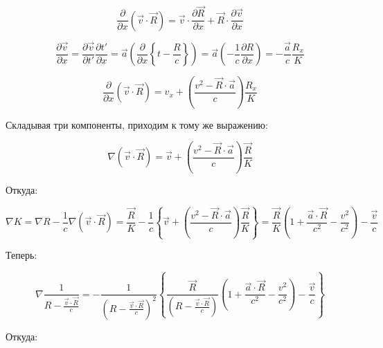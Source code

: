 \documentclass[12pt, a4paper]{article}
\begin{document}
\begin{equation}
\frac{\partial}{\partial x} (\vec{v} \cdot \vec{R}) = \vec{v} \cdot \frac{\partial \vec{R}}{\partial x} + \vec{R} \cdot \frac{\partial \vec{v}}{\partial x}
\label{eq:d_vR_dx}
\end{equation}

\begin{equation}
\frac{\partial \vec{v}}{\partial x} = \frac{\partial \vec{v}}{\partial t'} \frac{\partial t'}{\partial x} = \vec{a} \left( \frac{\partial}{\partial x} \left\{ t - \frac{R}{c} \right\} \right) = \vec{a} \left( -\frac{1}{c} \frac{\partial R}{\partial x} \right) = -\frac{\vec{a}}{c} \frac{R_x}{K}
\label{eq:dv_dx_short}
\end{equation}

\begin{equation}
\frac{\partial}{\partial x} (\vec{v} \cdot \vec{R}) = v_x + \left( \frac{v^2 - \vec{R} \cdot \vec{a}}{c} \right) \frac{R_x}{K}
\label{eq:d_vR_dx_final}
\end{equation}

Складывая три компоненты, приходим к тому же выражению:

\begin{equation}
\nabla (\vec{v} \cdot \vec{R}) = \vec{v} + \left( \frac{v^2 - \vec{R} \cdot \vec{a}}{c} \right) \frac{\vec{R}}{K}
\label{eq:grad_vR_verified}
\end{equation}

Откуда:

\begin{equation}
\nabla K = \nabla R - \frac{1}{c} \nabla (\vec{v} \cdot \vec{R}) = \frac{\vec{R}}{K} - \frac{1}{c} \left\{ \vec{v} + \left( \frac{v^2 - \vec{R} \cdot \vec{a}}{c} \right) \frac{\vec{R}}{K} \right\} = \frac{\vec{R}}{K} \left( 1 + \frac{\vec{a} \cdot \vec{R}}{c^2} - \frac{v^2}{c^2} \right) - \frac{\vec{v}}{c}
\label{eq:grad_K_final}
\end{equation}

Теперь:

\begin{equation}
\nabla \frac{1}{R - \frac{\vec{v} \cdot \vec{R}}{c}} = -\frac{1}{\left( R - \frac{\vec{v} \cdot \vec{R}}{c} \right)^2} \left\{ \frac{\vec{R}}{\left( R - \frac{\vec{v} \cdot \vec{R}}{c} \right)} \left( 1 + \frac{\vec{a} \cdot \vec{R}}{c^2} - \frac{v^2}{c^2} \right) - \frac{\vec{v}}{c} \right\}
\label{eq:grad_1_K_final}
\end{equation}

Откуда:
\end{document}
